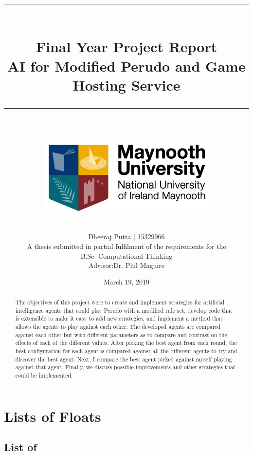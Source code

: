 \documentclass[12pt, a4paper, english]{report}
\title{
  \vspace{\vertnegspacing}
  \rule{\textwidth}{1.5pt}\\[\customvertspacing]
  \huge Final Year Project Report\\[0.2em]
  \Large AI for Modified Perudo and Game Hosting Service\\[\customvertspacing]
  \rule{\textwidth}{1.5pt}\\[\aftertitlespacing]
  \includegraphics[scale=\imgscaling]{NUIM-Crest.png}
  \vspace{\customvertnegspacing}
}
\author{
  Dheeraj Putta | 15329966\\[0.5em]
  {\small A thesis submitted in partial fulfilment of the requirements for the \\ B.Sc. Computational Thinking\\[0.5em]}
  {\small Advisor:\hspace{2mm}Dr. Phil Maguire}
}
\affil{Department of Computer Science\\Maynooth University, Ireland}
\date{March 19, 2019}
\makeatletter
\renewcommand\listoftables{%
  \section*{\listtablename}%
  \@mkboth{\MakeUppercase\listtablename}%
      {\MakeUppercase\listtablename}%
  \@starttoc{lot}%
}
\renewcommand\listoffigures{%
  \section*{\listfigurename}%
  \@mkboth{\MakeUppercase\listfigurename}%
      {\MakeUppercase\listfigurename}%
  \@starttoc{lof}%
}
\renewcommand\lstlistoflistings{%
  \section*{List of \lstlistlistingname}%
  \@mkboth{\MakeUppercase\lstlistlistingname}%
      {\MakeUppercase\lstlistlistingname}%
  \@starttoc{lol}%
}
\makeatother
\begin{document}
  \maketitle

  \begin{abstract}
    The objectives of this project were to create and implement strategies for artificial intelligence agents that could play Perudo with a modified rule set, develop code that is extensible to make it easy to add new strategies, and implement a method that allows the agents to play against each other.
    The developed agents are compared against each other but with different parameters as to compare and contrast on the effects of each of the different values. After picking the best agent from each round, the best configuration for each agent is compared against all the different agents to try and discover the best agent. Next, I compare the best agent picked against myself playing against that agent. Finally, we discuss possible improvements and other strategies that could be implemented.
  \end{abstract}

  \setcounter{tocdepth}{1}


  \tableofcontents
  \thispagestyle{empty}

  \chapter*{Lists of Floats}

  \listoftables

  \listoffigures

  \lstlistoflistings
  \thispagestyle{empty}

  \setcounter{page}{0}
  
  
  
  
  
  

  \clearpage %
  \nocite{*}
  \printbibliography

  
\end{document}
